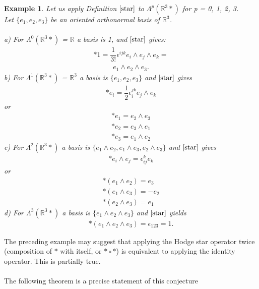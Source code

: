 \documentclass[12pt,a4paper]{article}
\newtheorem{exmp}{Example}[section]
\begin{document}
\begin{exmp}
Let us apply Definition $\ref{star}$ to $\Lambda^p(\mathbb{R}^3*)$ for p = 0, 1, 2, 3.\\
Let $\{e_1, e_2, e_3 \}$ be an oriented orthonormal basis of $\mathbb{R}^3$.
\\\\
a) For $\Lambda^0(\mathbb{R}^3*)$ = $\mathbb{R}$ a basis is 1, and $\ref{star}$ gives:
\begin{align*}
\ast 1 = \dfrac{1}{3!} \epsilon^{ijk} e_i \wedge e_j \wedge e_k =
\end{align*}
\begin{align*}
 e_1 \wedge e_2 \wedge e_3.
\end{align*}
b) For $\Lambda^1(\mathbb{R}^3*)$ = $\mathbb{R}^3$ a basis is $\{e_1, e_2, e_3 \}$ and $\ref{star}$ gives 
\begin{align*}
\ast e_i = \dfrac{1}{2} \epsilon^{jk}_i e_j \wedge e_k
\end{align*}
or
\begin{align*}
\ast e_1 = e_2 \wedge e_3\\
\ast e_2 = e_3 \wedge e_1\\
\ast e_3 = e_1 \wedge e_2
\end{align*}
c) For $\Lambda^2(\mathbb{R}^3*)$ a basis is $\{ e_1 \wedge e_2, e_1 \wedge e_3, e_2 \wedge e_3 \}$ and $\ref{star}$ gives
\begin{align*}
\ast e_i \wedge e_j = \epsilon^k_{ij} e_k
\end{align*}
or
\begin{align*}
\ast (e_1 \wedge e_2) = e_3\\
\ast (e_1 \wedge e_3) = - e_2\\
\ast(e_2 \wedge e_3) = e_1
\end{align*}
d) For $\Lambda^3(\mathbb{R}^3*)$ a basis is $\{ e_1 \wedge e_2 \wedge e_3 \}$ and $\ref{star}$ yields
\begin{align*}
\ast ( e_1 \wedge e_2 \wedge e_3) = \epsilon_{123}= 1.
\end{align*}
\end{exmp}
The preceding example may suggest that applying the Hodge star operator twice (composition of $\ast$ with itself, or $\ast \circ \ast$) is equivalent to applying the
identity operator. This is partially true. \\\\The following theorem is a precise
statement of this conjecture
\end{document}
